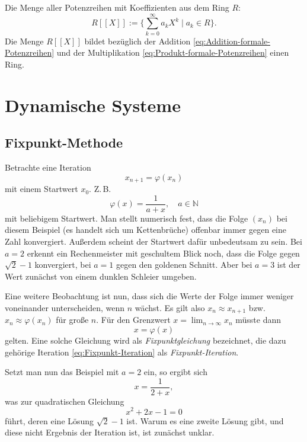 \documentclass[a4paper,11pt,fleqn,twoside]{scrartcl}
\numberwithin{equation}{section}
\newcommand{\N}{\mathbb N}
\theoremstyle{rmbox}
\begin{document}
Die Menge aller Potenzreihen mit Koeffizienten aus dem Ring $R$:
\begin{equation}\textstyle
R[[X]] := \{\sum_{k=0}^\infty a_k X^k\mid a_k\in R\}.
\end{equation}
Die Menge $R[[X]]$ bildet bezüglich der Addition
\eqref{eq:Addition-formale-Potenzreihen} und der Multiplikation
\eqref{eq:Produkt-formale-Potenzreihen}
einen Ring.

\newpage
\section{Dynamische Systeme}
\subsection{Fixpunkt-Methode}
Betrachte eine Iteration
\begin{equation}\label{eq:Fixpunkt-Iteration}
x_{n+1}=\varphi(x_n)
\end{equation}
mit einem Startwert $x_0$. Z.\,B.
\begin{equation}
\varphi(x) = \frac{1}{a+x},\quad a\in\N
\end{equation}
mit beliebigem Startwert. Man stellt numerisch fest, dass die
Folge $(x_n)$ bei diesem Beispiel (es handelt sich um Kettenbrüche)
offenbar immer gegen eine Zahl konvergiert. Außerdem
scheint der Startwert dafür unbedeutsam zu sein. Bei $a=2$ erkennt
ein Rechenmeister mit geschultem Blick noch, dass die Folge
gegen $\sqrt{2}-1$ konvergiert, bei $a=1$ gegen den goldenen Schnitt.
Aber bei $a=3$ ist der Wert zunächst von einem dunklen Schleier
umgeben.

Eine weitere Beobachtung ist nun, dass sich die Werte der Folge
immer weniger voneinander unterscheiden, wenn $n$ wächst.
Es gilt also $x_n\approx x_{n+1}$ bzw. $x_n\approx \varphi(x_n)$
für große $n$. Für den Grenzwert $x=\lim_{n\to\infty} x_n$ müsste
dann
\begin{equation}
x = \varphi(x)
\end{equation}
gelten. Eine solche Gleichung wird als \emph{Fixpunktgleichung}
bezeichnet, die dazu gehörige Iteration \eqref{eq:Fixpunkt-Iteration}
als \emph{Fixpunkt-Iteration}.

Setzt man nun das Beispiel mit $a=2$ ein, so ergibt
sich
\begin{equation}
x = \frac{1}{2+x},
\end{equation}
was zur quadratischen Gleichung
\begin{equation}
x^2+2x-1 = 0
\end{equation}
führt, deren eine Lösung $\sqrt{2}-1$ ist. Warum es eine zweite
Lösung gibt, und diese nicht Ergebnis der Iteration ist, ist
zunächst unklar.
\end{document}

